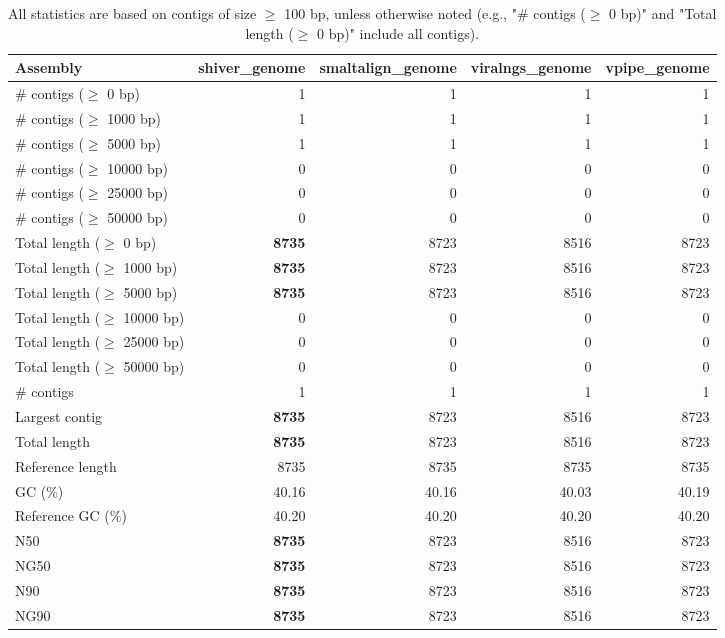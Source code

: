 \documentclass[12pt,a4paper]{article}
\begin{document}
\begin{table}[ht]
\begin{center}
\caption{All statistics are based on contigs of size $\geq$ 100 bp, unless otherwise noted (e.g., "\# contigs ($\geq$ 0 bp)" and "Total length ($\geq$ 0 bp)" include all contigs).}
\begin{tabular}{|l*{4}{|r}|}
\hline
Assembly & shiver\_genome & smaltalign\_genome & viralngs\_genome & vpipe\_genome \\ \hline
\# contigs ($\geq$ 0 bp) & 1 & 1 & 1 & 1 \\ \hline
\# contigs ($\geq$ 1000 bp) & 1 & 1 & 1 & 1 \\ \hline
\# contigs ($\geq$ 5000 bp) & 1 & 1 & 1 & 1 \\ \hline
\# contigs ($\geq$ 10000 bp) & 0 & 0 & 0 & 0 \\ \hline
\# contigs ($\geq$ 25000 bp) & 0 & 0 & 0 & 0 \\ \hline
\# contigs ($\geq$ 50000 bp) & 0 & 0 & 0 & 0 \\ \hline
Total length ($\geq$ 0 bp) & {\bf 8735} & 8723 & 8516 & 8723 \\ \hline
Total length ($\geq$ 1000 bp) & {\bf 8735} & 8723 & 8516 & 8723 \\ \hline
Total length ($\geq$ 5000 bp) & {\bf 8735} & 8723 & 8516 & 8723 \\ \hline
Total length ($\geq$ 10000 bp) & 0 & 0 & 0 & 0 \\ \hline
Total length ($\geq$ 25000 bp) & 0 & 0 & 0 & 0 \\ \hline
Total length ($\geq$ 50000 bp) & 0 & 0 & 0 & 0 \\ \hline
\# contigs & 1 & 1 & 1 & 1 \\ \hline
Largest contig & {\bf 8735} & 8723 & 8516 & 8723 \\ \hline
Total length & {\bf 8735} & 8723 & 8516 & 8723 \\ \hline
Reference length & 8735 & 8735 & 8735 & 8735 \\ \hline
GC (\%) & 40.16 & 40.16 & 40.03 & 40.19 \\ \hline
Reference GC (\%) & 40.20 & 40.20 & 40.20 & 40.20 \\ \hline
N50 & {\bf 8735} & 8723 & 8516 & 8723 \\ \hline
NG50 & {\bf 8735} & 8723 & 8516 & 8723 \\ \hline
N90 & {\bf 8735} & 8723 & 8516 & 8723 \\ \hline
NG90 & {\bf 8735} & 8723 & 8516 & 8723 \\ \hline

\end{tabular}
\end{center}
\end{table}
\end{document}
